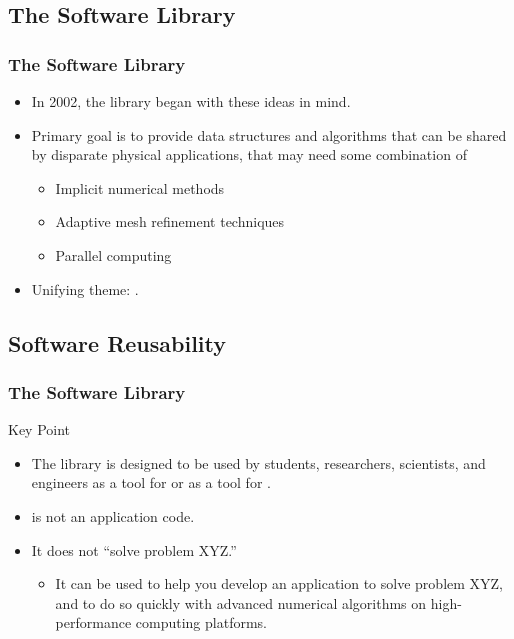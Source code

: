  

\subsection{The \libmesh{} Software Library}
\frame
{
  \frametitle{The \libmesh{} Software Library}
  \begin{itemize}
    \item In 2002, the \libmesh{} library began with these ideas in mind.
    \item Primary goal is to provide data structures and algorithms that can be shared by disparate physical applications, that may need some combination of
      \begin{itemize}
      \item Implicit numerical methods
      \item Adaptive mesh refinement techniques
      \item Parallel computing
      \end{itemize}
    \item Unifying theme: .
  \end{itemize}
}



 

\subsection{Software Reusability}
\frame
{
  \frametitle{The \libmesh{} Software Library}

  \begin{block}{Key Point}
    \begin{itemize}
      \item The \libmesh{} library is designed to be used by students, researchers, scientists, and engineers as a tool for  or as a tool for .
      \item \libMesh{} is not an application code.
      \item It does not ``solve problem XYZ.''
        \begin{itemize}
          \item It can be used to help you develop an application to solve problem XYZ, and to do so quickly with advanced numerical algorithms on high-performance computing platforms.
        \end{itemize}
    \end{itemize}    
  \end{block}
} 



